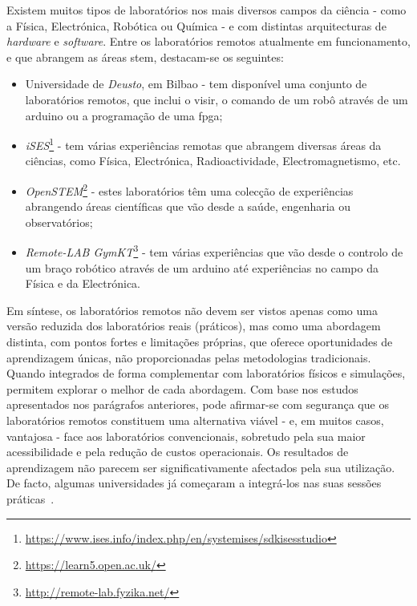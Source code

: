 Existem muitos tipos de laboratórios nos mais diversos campos da ciência - como a Física, Electrónica, Robótica ou Química - e com distintas arquitecturas de \textit{hardware} e \textit{software}. Entre os laboratórios remotos atualmente em funcionamento, e que abrangem as áreas \acrshort{stem}, destacam-se os seguintes:
\begin{itemize}
    \item Universidade de \textit{Deusto}, em Bilbao - tem disponível uma conjunto de laboratórios remotos, que inclui o \acrshort{visir}, o comando de um robô através de um \gls{arduino} ou a programação de uma \acrfull{fpga};
    \item \textit{iSES}\footnote{\url{https://www.ises.info/index.php/en/systemises/sdkisesstudio}} - tem várias experiências remotas que abrangem diversas áreas da ciências, como Física, Electrónica, Radioactividade, Electromagnetismo, etc.
    \item \textit{OpenSTEM}\footnote{\url{https://learn5.open.ac.uk/}} - estes laboratórios têm uma colecção de experiências abrangendo áreas científicas que vão desde a saúde, engenharia ou observatórios;
    \item \textit{Remote-LAB GymKT}\footnote{\url{http://remote-lab.fyzika.net/}} - tem várias experiências que vão desde o controlo de um braço robótico através de um \gls{arduino} até experiências no campo da Física e da Electrónica.
\end{itemize}

Em síntese, os laboratórios remotos não devem ser vistos apenas como uma versão reduzida dos laboratórios reais (práticos), mas como uma abordagem distinta, com pontos fortes e limitações próprias, que oferece oportunidades de aprendizagem únicas, não proporcionadas pelas metodologias tradicionais. Quando integrados de forma complementar com laboratórios físicos e simulações, permitem explorar o melhor de cada abordagem.
Com base nos estudos apresentados nos parágrafos anteriores, pode afirmar-se com segurança que os laboratórios remotos constituem uma alternativa viável - e, em muitos casos, vantajosa - face aos laboratórios convencionais, sobretudo pela sua maior acessibilidade e pela redução de custos operacionais. Os resultados de aprendizagem não parecem ser significativamente afectados pela sua utilização. De facto, algumas universidades já começaram a integrá-los nas suas sessões práticas~\cite{VISIREngineeringPractices}.

